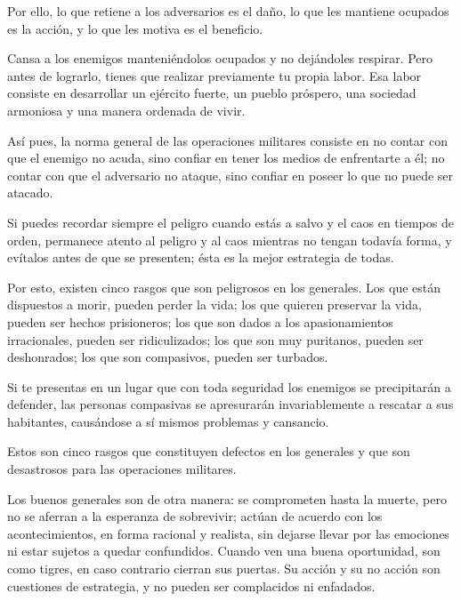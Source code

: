 Por ello, lo que retiene a los adversarios es el daño, lo que les mantiene ocupados es la acción, y lo que les motiva es el beneficio.

Cansa a los enemigos manteniéndolos ocupados y no dejándoles respirar. Pero antes de lograrlo, tienes que realizar previamente tu propia labor. Esa labor consiste en desarrollar un ejército fuerte, un pueblo próspero, una sociedad armoniosa y una manera ordenada de vivir.
 
Así pues, la norma general de las operaciones militares consiste en no contar con que el enemigo no acuda, sino confiar en tener los medios de enfrentarte a él; no contar con que el adversario no ataque, sino confiar en poseer lo que no puede ser atacado.

Si puedes recordar siempre el peligro cuando estás a salvo y el caos en tiempos de orden, permanece atento al peligro y al caos mientras no tengan todavía forma, y evítalos antes de que se presenten; ésta es la mejor estrategia de todas.

Por esto, existen cinco rasgos que son peligrosos en los generales. Los que están dispuestos a morir, pueden perder la vida; los que quieren preservar la vida, pueden ser hechos prisioneros; los que son dados a los apasionamientos irracionales, pueden ser ridiculizados; los que son muy puritanos, pueden ser deshonrados; los que son compasivos, pueden ser turbados.

Si te presentas en un lugar que con toda seguridad los enemigos se precipitarán a defender, las personas compasivas se apresurarán invariablemente a rescatar a sus habitantes, causándose a sí mismos problemas y cansancio.

Estos son cinco rasgos que constituyen defectos en los generales y que son desastrosos para las operaciones militares.

Los buenos generales son de otra manera: se comprometen hasta la muerte, pero no se aferran a la esperanza de sobrevivir; actúan de acuerdo con los acontecimientos, en forma racional y realista, sin dejarse llevar por las emociones ni estar sujetos a quedar confundidos. Cuando ven una buena oportunidad, son como tigres, en caso contrario cierran sus puertas. Su acción y su no acción son cuestiones de estrategia, y no pueden ser complacidos ni enfadados.
 
